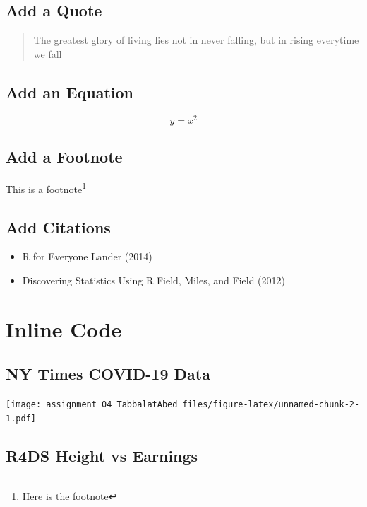 \documentclass[
]{article}
\providecommand{\tightlist}{%
  \setlength{\itemsep}{0pt}\setlength{\parskip}{0pt}}
\begin{document}
\hypertarget{add-a-quote}{%
\subsection{Add a Quote}\label{add-a-quote}}

\begin{quote}
The greatest glory of living lies not in never falling, but in rising
everytime we fall
\end{quote}

\hypertarget{add-an-equation}{%
\subsection{Add an Equation}\label{add-an-equation}}

\[y = x^{2}\]

\hypertarget{add-a-footnote}{%
\subsection{Add a Footnote}\label{add-a-footnote}}

This is a footnote\footnote{Here is the footnote}

\hypertarget{add-citations}{%
\subsection{Add Citations}\label{add-citations}}

\begin{itemize}
\tightlist
\item
  R for Everyone Lander (2014)
\item
  Discovering Statistics Using R Field, Miles, and Field (2012)
\end{itemize}

\hypertarget{inline-code}{%
\section{Inline Code}\label{inline-code}}

\hypertarget{ny-times-covid-19-data}{%
\subsection{NY Times COVID-19 Data}\label{ny-times-covid-19-data}}

\texttt{[image: assignment\_04\_TabbalatAbed\_files/figure-latex/unnamed-chunk-2-1.pdf]}

\hypertarget{r4ds-height-vs-earnings}{%
\subsection{R4DS Height vs Earnings}\label{r4ds-height-vs-earnings}}
\end{document}
